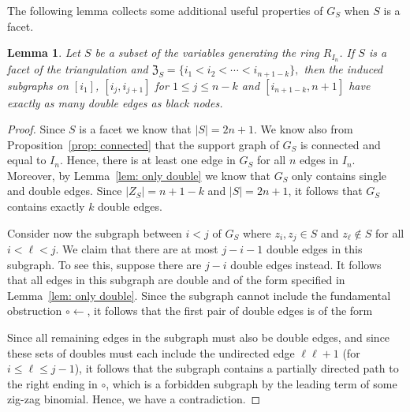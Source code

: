 \documentclass[11pt]{article}
\newtheorem{lemm}[theo]{Lemma}
\theoremstyle{definition}
\numberwithin{equation}{section}
\begin{document}
The following lemma collects some additional useful properties of $G_S$ when $S$ is a facet.  
\begin{lemm}
\label{lem: facet means connected}
Let $S$ be a subset of the variables generating the ring $R_{I_n}$.  If $S$ is a facet of the triangulation and 
$
\mathfrak{Z}_S = \{i_1< i_2 <\cdots < i_{n+1-k}\},
$
then the induced subgraphs on $[i_1]$, $[i_j,i_{j+1}]$ for $1\leq j\leq n-k$ and $[i_{n+1-k},n+1]$ have exactly as many double edges as black nodes.
\end{lemm}
\begin{proof}
Since $S$ is a facet we know that $|S| = 2n+1$.  
We know also from Proposition~\ref{prop: connected} that the support graph of $G_S$ is connected and equal to $I_{n}$. 
Hence, there is at least one edge in $G_S$ for all $n$ edges in $I_{n}$. 
Moreover, by Lemma~\ref{lem: only double} we know that $G_S$ only contains single and double edges. 
Since $|Z_S| = n+1-k$ and $|S| = 2n+1$, it follows that $G_S$ contains exactly $k$ double edges. 

Consider now the subgraph between $i < j$ of $G_S$ where $z_i, z_j \in S$ and $z_\ell\notin S$ for all $i < \ell < j$.  
We claim that there are at most $j - i - 1$ double edges in this subgraph.  
To see this, suppose there are $j-i$ double edges instead.  
It follows that all edges in this subgraph are double and of the form specified in Lemma~\ref{lem: only double}. 
Since the subgraph cannot include the fundamental obstruction $\circ\leftarrow$, it follows that the first pair of double edges is of the form
\begin{center}
\end{center}
Since all remaining edges in the subgraph must also be double edges, and since these sets of doubles must each include the undirected edge $\ell\ell+1$ (for $i\leq \ell\leq j-1$), it follows that the subgraph contains a partially directed path to the right ending in $\circ$, which is a forbidden subgraph by the leading term of some zig-zag binomial. 
Hence, we have a contradiction.  


\end{proof}
\end{document}

